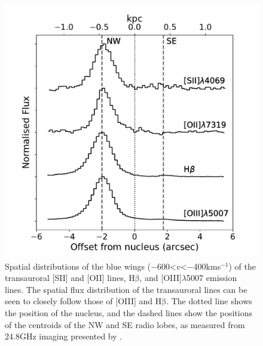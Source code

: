 \begin{figure}[!ht]
    \vspace*{1cm}
	\centering
	\includegraphics[width=0.7\linewidth]{figures/xshooter_ic5063/spatial_optical_labeled.pdf}
	\caption[Spatial distributions of the blue wings of the transauroral {[}OII{]} and {[}SII{]} lines, in addition to {[}OIII{]}$\lambda5007$ and H$\beta$ lines along the radio axis of IC.]{Spatial distributions of the blue wings (\mbox{$-$600\;\textless\;$v$\;\textless\;$-$400\;km\;s$^{-1}$}) of the transauroral [SII] and [OII] lines, H$\mathrm{\beta}$, and [OIII]$\lambda$5007 emission lines. The spatial flux distribution of the transauroral lines can be seen to closely follow those of [OIII] and H$\mathrm{\beta}$. The dotted line shows the position of the nucleus, and the dashed lines show the positions of the centroids of the NW and SE radio lobes, as measured from 24.8\;GHz imaging presented by \citet{Morganti2007}.}
	\label{fig: xshooter_ic5063: spatial_optical}
    \vspace*{1cm}
\end{figure}

